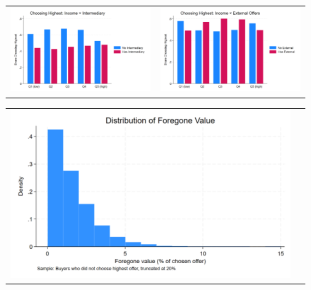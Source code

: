 \documentclass[12pt]{article}
\begin{document}
  \begin{figure}[H]
\caption{}
 \label{fig:ie4_11}
\centering{}%
\begin{tabular}{cc}
\includegraphics[scale=0.17]{figures/IE4/IE4_highest_income_intermediary.png} & \includegraphics[scale=0.17]{figures/IE4/IE4_highest_income_external.png} 
\end{tabular}
\end{figure} 


%




  \begin{figure}[H]
\caption{}
 \label{fig:ie4_11}
\centering{}%
\begin{tabular}{cc}
\includegraphics[scale=0.27]{figures/IE4/IE4_foregone_distribution.png} 
\end{tabular}
\end{figure} 
\end{document}
